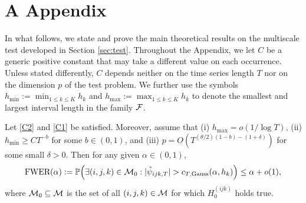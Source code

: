 \documentclass[a4paper,12pt]{article}
\numberwithin{equation}{section}
\begin{document}
\newpage
\section*{A \hspace{0.2cm} Appendix}
\def\theequation{A.\arabic{equation}}
\setcounter{equation}{0}

\enlargethispage{0.1cm}


In what follows, we state and prove the main theoretical results on the multiscale test developed in Section \ref{sec:test}. Throughout the Appendix, we let $C$ be a generic positive constant that may take a different value on each occurrence. Unless stated differently, $C$ depends neither on the time series length $T$ nor on the dimension $p$ of the test problem. We further use the symbols $h_{\min}:= \min_{1 \le k \le K} h_k$ and $h_{\max} := \max_{1 \le k \le K} h_k$ to denote the smallest and largest interval length in the family $\mathcal{F}$. 


\begin{theoremA}\label{theo1}
Let \ref{C2} and \ref{C1} be satisfied. Moreover, assume that (i) $h_{\max} = o(1/\log T)$, (ii) $h_{\min} \ge CT^{-b}$ for some $b \in (0,1)$, and (iii) $p = O(T^{(\theta/2)(1-b)-(1+\delta)})$ for some small $\delta > 0$. Then for any given $\alpha \in (0,1)$,
\[ \textnormal{FWER}(\alpha) := \mathbb{P} \Big( \exists (i,j,k) \in \mathcal{M}_0: |\hat{\psi}_{ijk,T}| > c_{T,\textnormal{Gauss}}(\alpha,h_k) \Big) \le \alpha + o(1), \]
where $\mathcal{M}_0 \subseteq \mathcal{M}$ is the set of all $(i,j,k) \in \mathcal{M}$ for which $H_0^{(ijk)}$ holds true. 
\end{theoremA}
\end{document}
